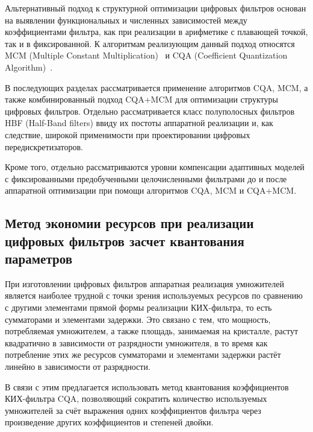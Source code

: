 Альтернативный подход к структурной оптимизации цифровых фильтров основан на выявлении функциональных и численных зависимостей между коэффициентами фильтра, как при реализации в арифметике с плавающей точкой, так и в фиксированной. К алгоритмам реализующим данный подход относятся MCM (Multiple Constant Multiplication)~\cite{Aksoy2010} и CQA (Coefficient Quantization Algorithm)~\cite{fir_quant}.

В последующих разделах рассматривается применение алгоритмов CQA, MCM, а также комбинированный подход CQA+MCM для оптимизации структуры цифровых фильтров. Отдельно рассматривается класс полуполосных фильтров HBF (Half-Band filters) ввиду их постоты аппаратной реализации и, как следствие, широкой применимости при проектировании цифровых передискретизаторов.

Кроме того, отдельно рассматриваются уровни компенсации адаптивных моделей с фиксированными предобученными целочисленными фильтрами до и после аппаратной оптимизации при помощи алгоритмов CQA, MCM и CQA+MCM.

\subsection{Метод экономии ресурсов при реализации цифровых фильтров засчет квантования параметров} \label{subsec:cqa}

При изготовлении цифровых фильтров аппаратная реализация умножителей является наиболее трудной с точки зрения используемых ресурсов по сравнению с другими элементами прямой формы реализации КИХ-фильтра, то есть сумматорами и элементами задержки. Это связано с тем, что мощность, потребляемая умножителем, а также площадь, занимаемая на кристалле, растут квадратично в зависимости от разрядности умножителя, в то время как потребление этих же ресурсов сумматорами и элементами задержки растёт линейно в зависимости от разрядности.

В связи с этим предлагается использовать метод квантования коэффициентов КИХ-фильтра CQA, позволяющий сократить количество используемых умножителей за счёт выражения одних коэффициентов фильтра через произведение других коэффициентов и степеней двойки. 

